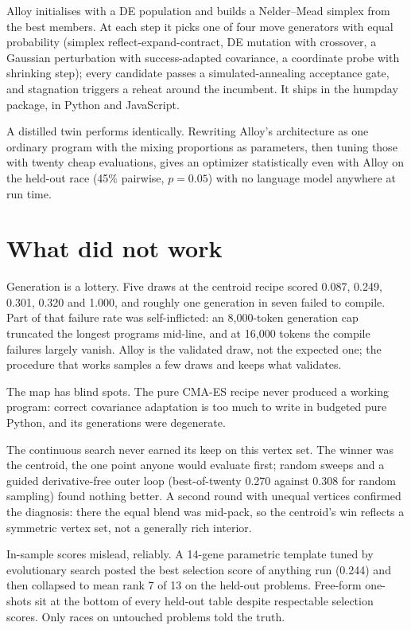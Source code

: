 \documentclass[11pt]{article}
\begin{document}
Alloy initialises with a DE population and builds a Nelder--Mead simplex
from the best members. At each step it picks one of four move generators
with equal probability (simplex reflect-expand-contract, DE mutation with
crossover, a Gaussian perturbation with success-adapted covariance, a
coordinate probe with shrinking step); every candidate passes a
simulated-annealing acceptance gate, and stagnation triggers a reheat
around the incumbent. It ships in the humpday package, in Python and
JavaScript.

A distilled twin performs identically. Rewriting Alloy's architecture as
one ordinary program with the mixing proportions as parameters, then tuning
those with twenty cheap evaluations, gives an optimizer statistically even
with Alloy on the held-out race (45\% pairwise, $p = 0.05$) with no
language model anywhere at run time.

\section{What did not work}
\label{sec:negative}

Generation is a lottery. Five draws at the centroid recipe scored 0.087,
0.249, 0.301, 0.320 and 1.000, and roughly one generation in seven failed
to compile. Part of that failure rate was self-inflicted: an 8{,}000-token
generation cap truncated the longest programs mid-line, and at 16{,}000
tokens the compile failures largely vanish. Alloy is the validated draw, not the expected one; the procedure
that works samples a few draws and keeps what validates.

The map has blind spots. The pure CMA-ES recipe never produced a working
program: correct covariance adaptation is too much to write in budgeted
pure Python, and its generations were degenerate.

The continuous search never earned its keep on this vertex set. The winner
was the centroid, the one point anyone would evaluate first; random sweeps
and a guided derivative-free outer loop (best-of-twenty 0.270 against
0.308 for random sampling) found nothing better. A second round with
unequal vertices confirmed the diagnosis: there the equal blend was
mid-pack, so the centroid's win reflects a symmetric vertex set, not a
generally rich interior.

In-sample scores mislead, reliably. A 14-gene parametric template tuned by
evolutionary search posted the best selection score of anything run (0.244)
and then collapsed to mean rank 7 of 13 on the held-out problems. Free-form
one-shots sit at the bottom of every held-out table despite respectable
selection scores. Only races on untouched problems told the truth.
\end{document}

